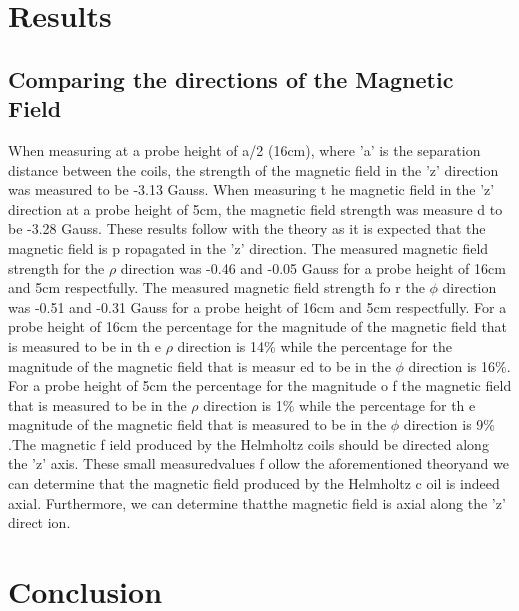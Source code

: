 \documentclass[a4paper]{article}
\begin{document}








\section{Results}



\subsection{Comparing the directions of the Magnetic Field}
When measuring at a probe height of a/2 (16cm), where 'a' is the separation distance between the coils, 
the strength of the magnetic field in the 'z' direction was measured to be -3.13 Gauss. When measuring t
he magnetic field in the 'z' direction at a probe height of 5cm, the magnetic field strength was measure
d to be -3.28 Gauss. These results follow with the theory as it is expected that the magnetic field is p
ropagated in the 'z' direction. The measured magnetic field strength for the $\rho$ direction was -0.46 
and -0.05 Gauss for a probe height of 16cm and 5cm respectfully. The measured magnetic field strength fo
r the $\phi$ direction was -0.51 and -0.31 Gauss for a probe height of 16cm and 5cm respectfully. For a 
probe height of 16cm the percentage for the magnitude of the magnetic field that is measured to be in th
e $\rho$ direction is 14$\%$ while the percentage for the magnitude of the magnetic field that is measur
ed to be in the $\phi$ direction is 16$\%$. For a probe height of 5cm the percentage for the magnitude o
f the magnetic field that is measured to be in the $\rho$ direction is 1$\%$ while the percentage for th
e magnitude of the magnetic field that is measured to be in the $\phi$ direction is 9$\%$.The magnetic f
ield produced by the Helmholtz coils should be directed along the 'z' axis. These small measuredvalues f
ollow the aforementioned theoryand we can determine that the magnetic field produced by the Helmholtz c
oil is indeed axial. Furthermore, we can determine thatthe magnetic field is axial along the 'z' direct
ion.
\section{Conclusion}
\end{document}
